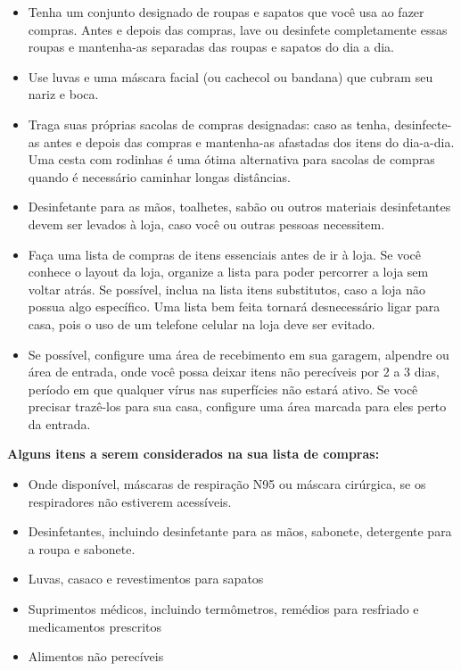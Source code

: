 \documentclass[onecolumn,journal]{IEEEtran}
\begin{document}
\begin{multicols}{2}
\begin{itemize}
    \item Tenha um conjunto designado de roupas e sapatos que você usa ao fazer compras. Antes e depois das compras, lave ou desinfete completamente essas roupas e mantenha-as separadas das roupas e sapatos do dia a dia.
    \item Use luvas e uma máscara facial (ou cachecol ou bandana) que cubram seu nariz e boca.
    \item Traga suas próprias sacolas de compras designadas: caso as tenha, desinfecte-as antes e depois das compras e mantenha-as afastadas dos itens do dia-a-dia. Uma cesta com rodinhas é uma ótima alternativa para sacolas de compras quando é necessário caminhar longas distâncias.
    \item Desinfetante para as mãos, toalhetes, sabão ou outros materiais desinfetantes devem ser levados à loja, caso você ou outras pessoas necessitem.
    \item Faça uma lista de compras de itens essenciais antes de ir à loja. Se você conhece o layout da loja, organize a lista para poder percorrer a loja sem voltar atrás. Se possível, inclua na lista itens substitutos, caso a loja não possua algo específico. Uma lista bem feita tornará desnecessário ligar para casa, pois o uso de um telefone celular na loja deve ser evitado.
    \item Se possível, configure uma área de recebimento em sua garagem, alpendre ou área de entrada, onde você possa deixar itens não perecíveis por 2 a 3 dias, período em que qualquer vírus nas superfícies não estará ativo. Se você precisar trazê-los para sua casa, configure uma área marcada para eles perto da entrada.
\end{itemize}

\vspace{2ex}

\textbf{Alguns itens a serem considerados na sua lista de compras:}

\vspace{2ex}

\begin{itemize}
    \item Onde disponível, máscaras de respiração N95 ou máscara cirúrgica, se os respiradores não estiverem acessíveis.
    \item Desinfetantes, incluindo desinfetante para as mãos, sabonete, detergente para a roupa e sabonete.
    \item Luvas, casaco e revestimentos para sapatos
    \item Suprimentos médicos, incluindo termômetros, remédios para resfriado e medicamentos prescritos
    \item Alimentos não perecíveis
\end{itemize}


\end{multicols}
\end{document}
